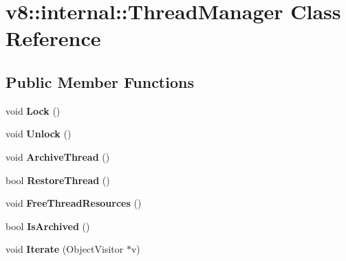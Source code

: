 \hypertarget{classv8_1_1internal_1_1_thread_manager}{}\section{v8\+:\+:internal\+:\+:Thread\+Manager Class Reference}
\label{classv8_1_1internal_1_1_thread_manager}
\subsection*{Public Member Functions}
\begin{DoxyCompactItemize}
\item 
\hypertarget{classv8_1_1internal_1_1_thread_manager_a8de7abc8b0763f0e1117b61f074410da}{}void {\bfseries Lock} ()\label{classv8_1_1internal_1_1_thread_manager_a8de7abc8b0763f0e1117b61f074410da}

\item 
\hypertarget{classv8_1_1internal_1_1_thread_manager_ab7d0f390011373f4b036548923add1bf}{}void {\bfseries Unlock} ()\label{classv8_1_1internal_1_1_thread_manager_ab7d0f390011373f4b036548923add1bf}

\item 
\hypertarget{classv8_1_1internal_1_1_thread_manager_a36506aaa6d781c749efe48996b48e2a0}{}void {\bfseries Archive\+Thread} ()\label{classv8_1_1internal_1_1_thread_manager_a36506aaa6d781c749efe48996b48e2a0}

\item 
\hypertarget{classv8_1_1internal_1_1_thread_manager_ac7d4ad5d9a21d88fc2d50f5d91a62442}{}bool {\bfseries Restore\+Thread} ()\label{classv8_1_1internal_1_1_thread_manager_ac7d4ad5d9a21d88fc2d50f5d91a62442}

\item 
\hypertarget{classv8_1_1internal_1_1_thread_manager_a7ff25a1bc335c55e57bae1f262f5ac0e}{}void {\bfseries Free\+Thread\+Resources} ()\label{classv8_1_1internal_1_1_thread_manager_a7ff25a1bc335c55e57bae1f262f5ac0e}

\item 
\hypertarget{classv8_1_1internal_1_1_thread_manager_a8a5b4eb523ed06c372852b14b5825efb}{}bool {\bfseries Is\+Archived} ()\label{classv8_1_1internal_1_1_thread_manager_a8a5b4eb523ed06c372852b14b5825efb}

\item 
\hypertarget{classv8_1_1internal_1_1_thread_manager_adeebd606e3b84bf2695ef0e36e90c360}{}void {\bfseries Iterate} (Object\+Visitor $\ast$v)\label{classv8_1_1internal_1_1_thread_manager_adeebd606e3b84bf2695ef0e36e90c360}


\end{DoxyCompactItemize}

